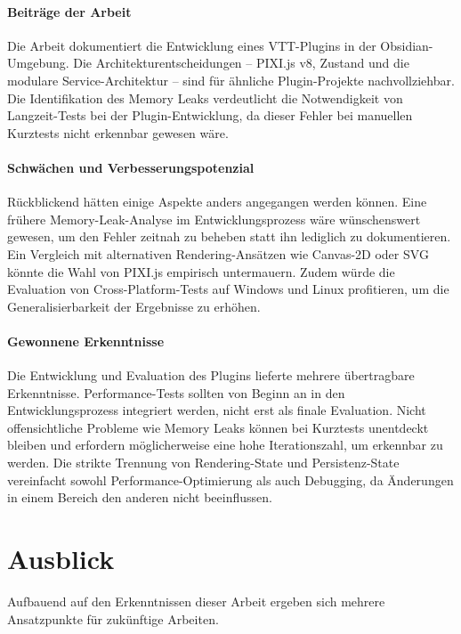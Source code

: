 \paragraph{Beiträge der Arbeit}

Die Arbeit dokumentiert die Entwicklung eines \ac{VTT}-Plugins in der Obsidian-Umgebung. Die Architekturentscheidungen -- PIXI.js v8, Zustand und die modulare Service-Architektur -- sind für ähnliche Plugin-Projekte nachvollziehbar. Die Identifikation des Memory Leaks verdeutlicht die Notwendigkeit von Langzeit-Tests bei der Plugin-Entwicklung, da dieser Fehler bei manuellen Kurztests nicht erkennbar gewesen wäre.

\paragraph{Schwächen und Verbesserungspotenzial}

Rückblickend hätten einige Aspekte anders angegangen werden können. Eine frühere Memory-Leak-Analyse im Entwicklungsprozess wäre wünschenswert gewesen, um den Fehler zeitnah zu beheben statt ihn lediglich zu dokumentieren. Ein Vergleich mit alternativen Rendering-Ansätzen wie Canvas-2D oder SVG könnte die Wahl von PIXI.js empirisch untermauern. Zudem würde die Evaluation von Cross-Platform-Tests auf Windows und Linux profitieren, um die Generalisierbarkeit der Ergebnisse zu erhöhen.

\paragraph{Gewonnene Erkenntnisse}

Die Entwicklung und Evaluation des Plugins lieferte mehrere übertragbare Erkenntnisse. Performance-Tests sollten von Beginn an in den Entwicklungsprozess integriert werden, nicht erst als finale Evaluation. Nicht offensichtliche Probleme wie Memory Leaks können bei Kurztests unentdeckt bleiben und erfordern möglicherweise eine hohe Iterationszahl, um erkennbar zu werden. Die strikte Trennung von Rendering-State und Persistenz-State vereinfacht sowohl Performance-Optimierung als auch Debugging, da Änderungen in einem Bereich den anderen nicht beeinflussen.

\section{Ausblick}
\label{sec:Ausblick}

Aufbauend auf den Erkenntnissen dieser Arbeit ergeben sich mehrere Ansatzpunkte für zukünftige Arbeiten.

